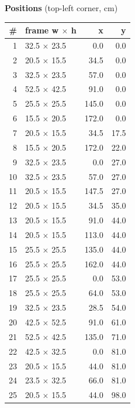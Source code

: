 \documentclass[a4paper,landscape,10pt]{article}
\begin{document}
\begin{minipage}[t]{0.25\textwidth}
\vspace{8pt}
{\bfseries Positions} (top-left corner, cm)\\[2pt]
\tiny
\begin{tabular}{@{}r l r r@{}}
\toprule
\# & frame w $\times$ h & x & y \\
\midrule
1 & 32.5 $\times$ 23.5 & 0.0 & 0.0 \\
2 & 20.5 $\times$ 15.5 & 34.5 & 0.0 \\
3 & 32.5 $\times$ 23.5 & 57.0 & 0.0 \\
4 & 52.5 $\times$ 42.5 & 91.0 & 0.0 \\
5 & 25.5 $\times$ 25.5 & 145.0 & 0.0 \\
6 & 15.5 $\times$ 20.5 & 172.0 & 0.0 \\
7 & 20.5 $\times$ 15.5 & 34.5 & 17.5 \\
8 & 15.5 $\times$ 20.5 & 172.0 & 22.0 \\
9 & 32.5 $\times$ 23.5 & 0.0 & 27.0 \\
10 & 32.5 $\times$ 23.5 & 57.0 & 27.0 \\
11 & 20.5 $\times$ 15.5 & 147.5 & 27.0 \\
12 & 20.5 $\times$ 15.5 & 34.5 & 35.0 \\
13 & 20.5 $\times$ 15.5 & 91.0 & 44.0 \\
14 & 20.5 $\times$ 15.5 & 113.0 & 44.0 \\
15 & 25.5 $\times$ 25.5 & 135.0 & 44.0 \\
16 & 25.5 $\times$ 25.5 & 162.0 & 44.0 \\
17 & 25.5 $\times$ 25.5 & 0.0 & 53.0 \\
18 & 25.5 $\times$ 25.5 & 64.0 & 53.0 \\
19 & 32.5 $\times$ 23.5 & 28.5 & 54.0 \\
20 & 42.5 $\times$ 52.5 & 91.0 & 61.0 \\
21 & 52.5 $\times$ 42.5 & 135.0 & 71.0 \\
22 & 42.5 $\times$ 32.5 & 0.0 & 81.0 \\
23 & 20.5 $\times$ 15.5 & 44.0 & 81.0 \\
24 & 23.5 $\times$ 32.5 & 66.0 & 81.0 \\
25 & 20.5 $\times$ 15.5 & 44.0 & 98.0 \\
\bottomrule
\end{tabular}
\end{minipage}
\clearpage
\end{document}
